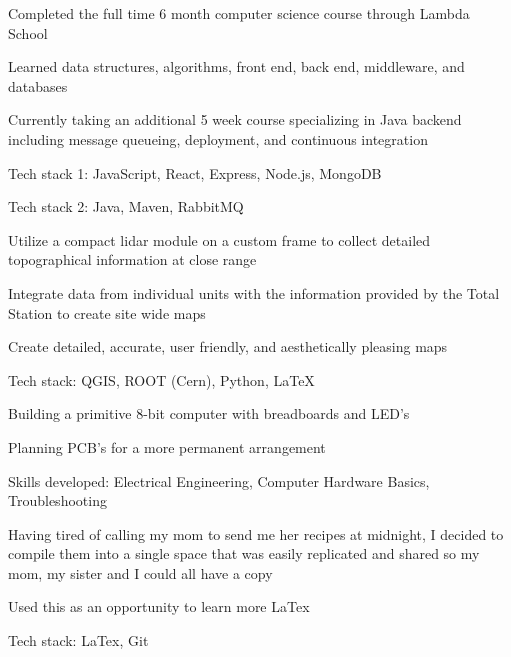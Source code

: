 \documentclass[letterpaper]{resume}
\begin{document}
\begin{compactitem}
\item Completed the full time 6 month computer science course through Lambda School
\item Learned data structures, algorithms, front end, back end, middleware, and databases
\item Currently taking an additional 5 week course specializing in Java backend including message queueing, deployment, and continuous integration
\item Tech stack 1: JavaScript, React, Express, Node.js, MongoDB
\item Tech stack 2: Java, Maven, RabbitMQ
\end{compactitem}

\begin{compactitem}
\item Utilize a compact lidar module on a custom frame to collect detailed topographical information at close range
\item Integrate data from individual units with the information provided by the Total Station to create site wide maps
\item Create detailed, accurate, user friendly, and aesthetically pleasing maps
\item Tech stack: QGIS, ROOT (Cern), Python, LaTeX
\end{compactitem}

\begin{compactitem}
\item Building a primitive 8-bit computer with breadboards and LED's
\item Planning PCB's for a more permanent arrangement
\item Skills developed: Electrical Engineering, Computer Hardware Basics, Troubleshooting
\end{compactitem}

\begin{compactitem}
\item Having tired of calling my mom to send me her recipes at midnight, I decided to compile them into a single space that was easily replicated and shared so my mom, my sister and I could all have a copy
\item Used this as an opportunity to learn more LaTex
\item Tech stack: LaTex, Git
\end{compactitem}
\end{document}

